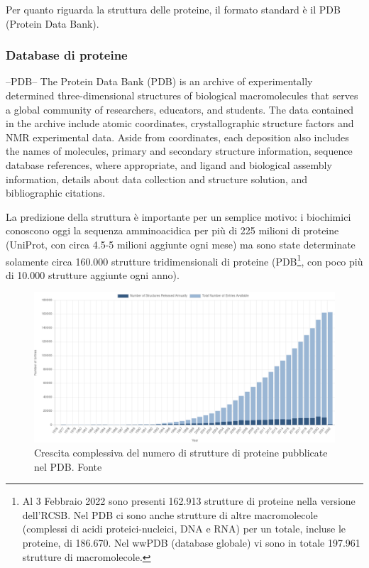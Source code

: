 \par Per quanto riguarda la struttura delle proteine, il formato standard è il PDB (Protein Data Bank).

\subsubsection{Database di proteine}


--PDB--
The Protein Data Bank (PDB) is an archive of experimentally determined three-dimensional
structures of biological macromolecules that serves a global community of researchers, educators,
and students. The data contained in the archive include atomic coordinates, crystallographic
structure factors and NMR experimental data. Aside from coordinates, each deposition also
includes the names of molecules, primary and secondary structure information, sequence
database references, where appropriate, and ligand and biological assembly information, details
about data collection and structure solution, and bibliographic citations.


\par La predizione della struttura è importante per un semplice motivo: i biochimici conoscono oggi la sequenza amminoacidica per più di 225 milioni di proteine\supercite{proteienDBentries} (UniProt, con circa 4.5-5 milioni aggiunte ogni mese) ma sono state determinate solamente circa 160.000 strutture tridimensionali di proteine\supercite{proteienDBentries} (PDB\footnote{Al 3 Febbraio 2022 sono presenti 162.913 strutture di proteine nella versione dell'RCSB. Nel PDB ci sono anche strutture di altre macromolecole (complessi di acidi proteici-nucleici, DNA e RNA) per un totale, incluse le proteine, di 186.670\supercite{pdbStats}. Nel wwPDB (database globale) vi sono in totale 197.961 strutture di macromolecole\supercite{wwpdbStats}.}, con poco più di 10.000 strutture aggiunte ogni anno). 

\begin{figure}[!htb]
	\centering
	\includegraphics[scale=0.3]{images/pdb-statistica.png}
	\caption{Crescita complessiva del numero di strutture di proteine pubblicate nel PDB. Fonte\cite{pdbStats}}
	\label{fig:pdb-statistica}
\end{figure}


